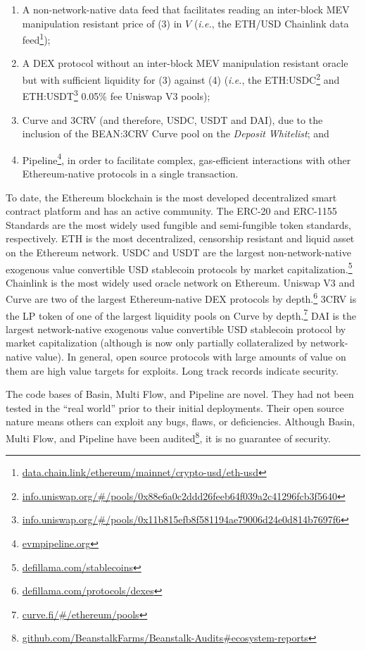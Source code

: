 \documentclass[tikz]{article}
\newcommand{\term}[1]{\textsl{#1}}
\newcommand{\fref}[1]{\footnote{\href{http://#1}{#1}}}
\begin{document}
\begin{enumerate}[label=(\arabic*), start=5]
  \item A non-network-native data feed that facilitates reading an inter-block MEV manipulation resistant price of (3) in $V$ (\term{i.e.}, the ETH/USD Chainlink data feed\fref{data.chain.link/ethereum/mainnet/crypto-usd/eth-usd});

  \item A DEX protocol without an inter-block MEV manipulation resistant oracle but with sufficient liquidity for (3) against (4) (\term{i.e.}, the ETH:USDC\fref{info.uniswap.org/\#/pools/0x88e6a0c2ddd26feeb64f039a2c41296fcb3f5640} and ETH:USDT\fref{info.uniswap.org/\#/pools/0x11b815efb8f581194ae79006d24e0d814b7697f6} 0.05\% fee Uniswap V3 pools);

  \item Curve and 3CRV (and therefore, USDC, USDT and DAI), due to the inclusion of the BEAN:3CRV Curve pool on the \term{Deposit Whitelist}; and

  \item Pipeline\fref{evmpipeline.org}, in order to facilitate complex, gas-efficient interactions with other Ethereum-native protocols in a single transaction.
\end{enumerate}

To date, the Ethereum blockchain is the most developed decentralized smart contract platform and has an active community. The ERC-20 and ERC-1155 Standards are the most widely used fungible and semi-fungible token standards, respectively. ETH is the most decentralized, censorship resistant and liquid asset on the Ethereum network. USDC and USDT are the largest non-network-native exogenous value convertible USD stablecoin protocols by market capitalization.\fref{defillama.com/stablecoins} Chainlink is the most widely used oracle network on Ethereum. Uniswap V3 and Curve are two of the largest Ethereum-native DEX protocols by depth.\fref{defillama.com/protocols/dexes} 3CRV is the LP token of one of the largest liquidity pools on Curve by depth.\fref{curve.fi/\#/ethereum/pools} DAI is the largest network-native exogenous value convertible USD stablecoin protocol by market capitalization (although is now only partially collateralized by network-native value). In general, open source protocols with large amounts of value on them are high value targets for exploits. Long track records indicate security. 

The code bases of Basin, Multi Flow, and Pipeline are novel. They had not been tested in the “real world” prior to their initial deployments. Their open source nature means others can exploit any bugs, flaws, or deficiencies. Although Basin, Multi Flow, and Pipeline have been audited\fref{github.com/BeanstalkFarms/Beanstalk-Audits\#ecosystem-reports}, it is no guarantee of security.
\end{document}
